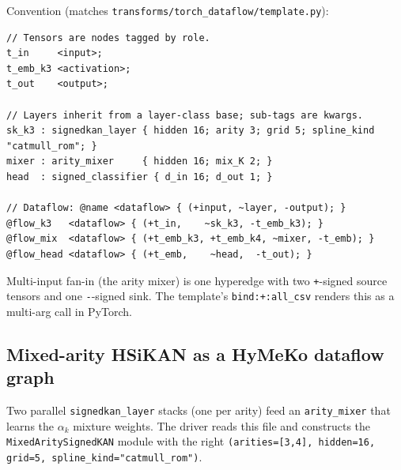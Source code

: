 \documentclass[11pt,a4paper]{article}
\newcommand{\code}[1]{\texttt{\small #1}}
\begin{document}
Convention (matches
\code{transforms/torch\_dataflow/template.py}):

\begin{lstlisting}
// Tensors are nodes tagged by role.
t_in     <input>;
t_emb_k3 <activation>;
t_out    <output>;

// Layers inherit from a layer-class base; sub-tags are kwargs.
sk_k3 : signedkan_layer { hidden 16; arity 3; grid 5; spline_kind "catmull_rom"; }
mixer : arity_mixer     { hidden 16; mix_K 2; }
head  : signed_classifier { d_in 16; d_out 1; }

// Dataflow: @name <dataflow> { (+input, ~layer, -output); }
@flow_k3   <dataflow> { (+t_in,    ~sk_k3, -t_emb_k3); }
@flow_mix  <dataflow> { (+t_emb_k3, +t_emb_k4, ~mixer, -t_emb); }
@flow_head <dataflow> { (+t_emb,    ~head,  -t_out); }
\end{lstlisting}

Multi-input fan-in (the arity mixer) is one hyperedge with two
\code{+}-signed source tensors and one \code{-}-signed sink. The
template's \code{bind:+:all\_csv} renders this as a multi-arg call
in PyTorch.

\subsection{Mixed-arity HSiKAN as a HyMeKo dataflow graph}

\begin{center}
\end{center}

Two parallel \code{signedkan\_layer}{} stacks (one per arity) feed
an \code{arity\_mixer} that learns the $\alpha_k$ mixture
weights. The driver reads this file and constructs the
\code{MixedAritySignedKAN} module with the right
\code{(arities=[3,4], hidden=16, grid=5, spline\_kind="catmull\_rom")}.
\end{document}
